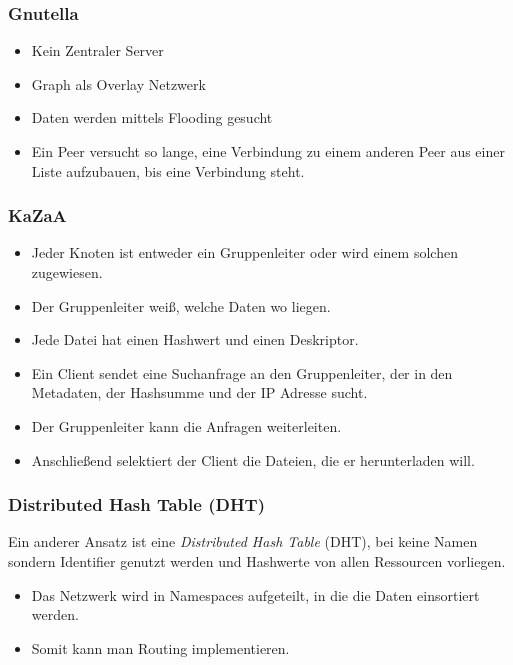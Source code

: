             \subsubsection{Gnutella}
                \begin{itemize}
                	\item Kein Zentraler Server
                	\item Graph als Overlay Netzwerk
                	\item Daten werden mittels Flooding gesucht
                	\item Ein Peer versucht so lange, eine Verbindung zu einem anderen Peer aus einer Liste aufzubauen, bis eine Verbindung steht.
                \end{itemize}
            
            \subsubsection{KaZaA}
                \begin{itemize}
                	\item Jeder Knoten ist entweder ein Gruppenleiter oder wird einem solchen zugewiesen.
                	\item Der Gruppenleiter weiß, welche Daten wo liegen.
                	\item Jede Datei hat einen Hashwert und einen Deskriptor.
                	\item Ein Client sendet eine Suchanfrage an den Gruppenleiter, der in den Metadaten, der Hashsumme und der IP Adresse sucht.
                	\item Der Gruppenleiter kann die Anfragen weiterleiten.
                	\item Anschließend selektiert der Client die Dateien, die er herunterladen will.
                \end{itemize}
            
            \subsubsection{Distributed Hash Table (DHT)}
                Ein anderer Ansatz ist eine \textit{Distributed Hash Table} (DHT), bei keine Namen sondern Identifier genutzt werden und Hashwerte von allen Ressourcen vorliegen.
                
                \begin{itemize}
                	\item Das Netzwerk wird in Namespaces aufgeteilt, in die die Daten einsortiert werden.
                	\item Somit kann man Routing implementieren.
                \end{itemize}
            

